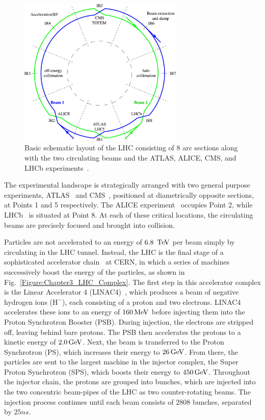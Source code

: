 \begin{figure}[h]
\centering
\includegraphics[width= 0.7\textwidth]{Figures/Chapter3/LHC_BasicLayout.jpg}
\caption{Basic schematic layout of the LHC consisting of 8 arc sections along with the two circulating beams and the ATLAS, ALICE, CMS, and LHCb experiments~\cite{LHC_BasicLayout}.}
\label{Figure:Chapter3_LHC_BasicLayout}
\end{figure}

The experimental landscape is strategically arranged with two general purpose experiments, ATLAS~\cite{LHC_ATLAS} and CMS~\cite{LHC_CMS}, positioned at diametrically opposite sections, at Points 1 and 5 respectively. The ALICE experiment~\cite{LHC_ALICE} occupies Point 2, while LHCb~\cite{LHC_LCHb} is situated at Point 8. At each of these critical locations, the circulating beams are precisely focused and brought into collision.

Particles are not accelerated to an energy of $6.8~\,\text{Te\hspace{-.08em}V}$ per beam simply by circulating in the LHC tunnel. Instead, the LHC is the final stage of a sophisticated accelerator chain~\cite{LHC_InjectorComplex} at CERN, in which a series of machines successively boost the energy of the particles, as shown in Fig.~\ref{Figure:Chapter3_LHC_Complex}. The first step in this accelerator complex is the Linear Accelerator 4 (LINAC4)~\cite{LINAC4}, which produces a beam of negative hydrogen ions ($\text{H}^-$), each consisting of a proton and two electrons. LINAC4 accelerates these ions to an energy of $160\,\text{Me\hspace{-.08em}V}$ before injecting them into the Proton Synchrotron Booster (PSB). During injection, the electrons are stripped off, leaving behind bare protons. The PSB then accelerates the protons to a kinetic energy of $2.0\,\text{Ge\hspace{-.08em}V}$. Next, the beam is transferred to the Proton Synchrotron (PS), which increases their energy to $26\,\text{Ge\hspace{-.08em}V}$. From there, the particles are sent to the largest machine in the injector complex, the Super Proton Synchrotron (SPS), which boosts their energy to $450\,\text{Ge\hspace{-.08em}V}$. Throughout the injector chain, the protons are grouped into bunches, which are injected into the two concentric beam-pipes of the LHC as two counter-rotating beams. The injection process continues until each beam consists of 2808 bunches, separated by $25\unit{ns}$.

